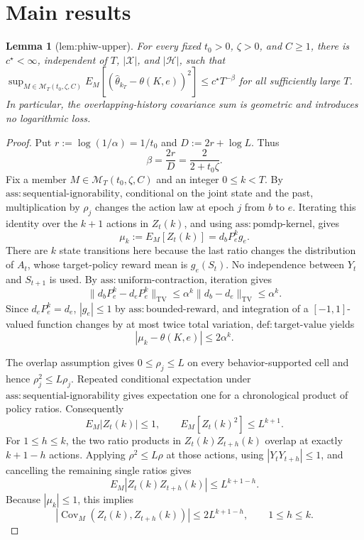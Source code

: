 \documentclass{article}
\newtheorem{lemma}{Lemma}
\begin{document}
\section{Main results}

\begin{lemma}[lem:phiw-upper]\label{lem:phiw-upper}
For every fixed \(t_0>0\), \(\zeta>0\), and \(C\ge1\), there is \(c^\star<\infty\), independent of \(T\), \(|\mathcal X|\), and \(|\mathcal H|\), such that \(\sup_{M\in\mathcal M_T(t_0,\zeta,C)}E_M[(\widehat\theta_{k_T}-\theta(K,e))^2]\le c^\star T^{-\beta}\) for all sufficiently large \(T\). In particular, the overlapping-history covariance sum is geometric and introduces no logarithmic loss.
\end{lemma}
\begin{proof}
Put \(r:=\log(1/\alpha)=1/t_0\) and \(D:=2r+\log L\).  Thus
\[
 \beta=\frac{2r}{D}=\frac{2}{2+t_0\zeta}.
\]
Fix a member \(M\in\mathcal M_T(t_0,\zeta,C)\) and an integer \(0\le k<T\).  By \(\mathrm{ass{:}sequential\text{-}ignorability}\), conditional on the joint state and the past, multiplication by \(\rho_j\) changes the action law at epoch \(j\) from \(b\) to \(e\).  Iterating this identity over the \(k+1\) actions in \(Z_t(k)\), and using \(\mathrm{ass{:}pomdp\text{-}kernel}\), gives
\[
 \mu_k:=E_M[Z_t(k)]=d_bP_e^kg_e .
\]
There are \(k\) state transitions here because the last ratio changes the distribution of \(A_t\), whose target-policy reward mean is \(g_e(S_t)\).  No independence between \(Y_t\) and \(S_{t+1}\) is used.  By \(\mathrm{ass{:}uniform\text{-}contraction}\), iteration gives
\[
 \|d_bP_e^k-d_eP_e^k\|_{\mathrm{TV}}
 \le \alpha^k\|d_b-d_e\|_{\mathrm{TV}}\le \alpha^k.
\]
Since \(d_eP_e^k=d_e\), \(|g_e|\le1\) by \(\mathrm{ass{:}bounded\text{-}reward}\), and integration of a \([-1,1]\)-valued function changes by at most twice total variation, \(\mathrm{def{:}target\text{-}value}\) yields
\[
 |\mu_k-\theta(K,e)|\le2\alpha^k. \tag{1}
\]

The overlap assumption gives \(0\le\rho_j\le L\) on every behavior-supported cell and hence \(\rho_j^2\le L\rho_j\).  Repeated conditional expectation under \(\mathrm{ass{:}sequential\text{-}ignorability}\) gives expectation one for a chronological product of policy ratios.  Consequently
\[
 E_M|Z_t(k)|\le1,
 \qquad E_M[Z_t(k)^2]\le L^{k+1}. \tag{2}
\]
For \(1\le h\le k\), the two ratio products in \(Z_t(k)Z_{t+h}(k)\) overlap at exactly \(k+1-h\) actions.  Applying \(\rho^2\le L\rho\) at those actions, using \(|Y_tY_{t+h}|\le1\), and cancelling the remaining single ratios gives
\[
 E_M|Z_t(k)Z_{t+h}(k)|\le L^{k+1-h}.
\]
Because \(|\mu_k|\le1\), this implies
\[
 |\operatorname{Cov}_M(Z_t(k),Z_{t+h}(k))|
 \le2L^{k+1-h},\qquad 1\le h\le k. \tag{3}
\]


\end{proof}
\end{document}
